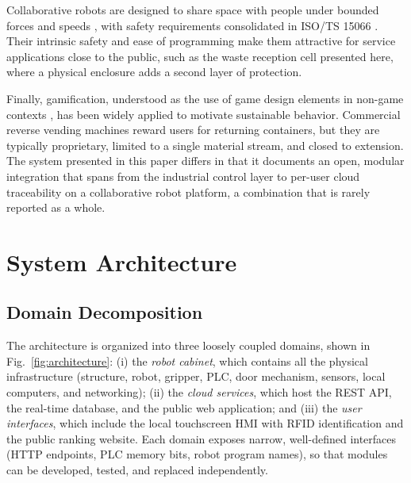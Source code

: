 \documentclass[conference]{IEEEtran}
\begin{document}
Collaborative robots are designed to share space with people under bounded forces and speeds \cite{b10}, with safety requirements consolidated in ISO/TS 15066 \cite{b11}. Their intrinsic safety and ease of programming make them attractive for service applications close to the public, such as the waste reception cell presented here, where a physical enclosure adds a second layer of protection.

Finally, gamification, understood as the use of game design elements in non-game contexts \cite{b12}, has been widely applied to motivate sustainable behavior. Commercial reverse vending machines reward users for returning containers, but they are typically proprietary, limited to a single material stream, and closed to extension. The system presented in this paper differs in that it documents an open, modular integration that spans from the industrial control layer to per-user cloud traceability on a collaborative robot platform, a combination that is rarely reported as a whole.

\section{System Architecture}
\subsection{Domain Decomposition}
The architecture is organized into three loosely coupled domains, shown in Fig.~\ref{fig:architecture}: (i) the \emph{robot cabinet}, which contains all the physical infrastructure (structure, robot, gripper, PLC, door mechanism, sensors, local computers, and networking); (ii) the \emph{cloud services}, which host the REST API, the real-time database, and the public web application; and (iii) the \emph{user interfaces}, which include the local touchscreen HMI with RFID identification and the public ranking website. Each domain exposes narrow, well-defined interfaces (HTTP endpoints, PLC memory bits, robot program names), so that modules can be developed, tested, and replaced independently.
\end{document}
